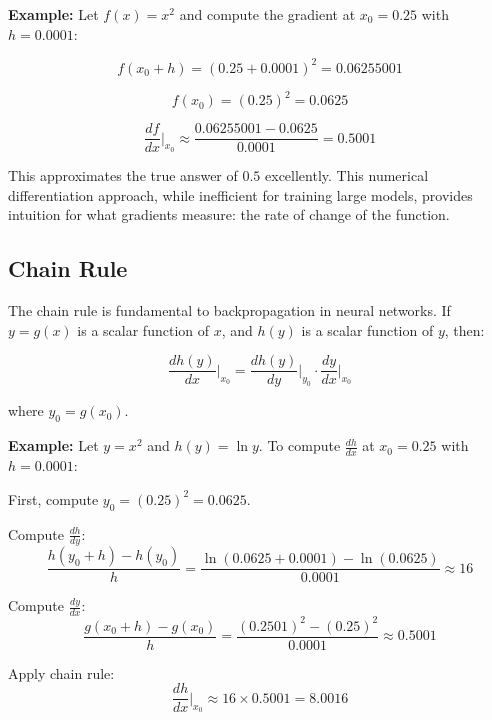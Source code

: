 \documentclass{book}
\begin{document}
\textbf{Example:} Let $f(x) = x^2$ and compute the gradient at $x_0 = 0.25$ with $h = 0.0001$:

\begin{equation}
f(x_0 + h) = (0.25 + 0.0001)^2 = 0.06255001
\end{equation}

\begin{equation}
f(x_0) = (0.25)^2 = 0.0625
\end{equation}

\begin{equation}
\frac{df}{dx}\bigg|_{x_0} \approx \frac{0.06255001 - 0.0625}{0.0001} = 0.5001
\end{equation}

This approximates the true answer of $0.5$ excellently. This numerical differentiation approach, while inefficient for training large models, provides intuition for what gradients measure: the rate of change of the function.

\subsection{Chain Rule}
\label{sec:chain-rule}

The chain rule is fundamental to backpropagation in neural networks. If $y = g(x)$ is a scalar function of $x$, and $h(y)$ is a scalar function of $y$, then:

\begin{equation}
\label{eq:chain-rule}
\frac{dh(y)}{dx}\bigg|_{x_0} = \frac{dh(y)}{dy}\bigg|_{y_0} \cdot \frac{dy}{dx}\bigg|_{x_0}
\end{equation}

where $y_0 = g(x_0)$.

\textbf{Example:} Let $y = x^2$ and $h(y) = \ln y$. To compute $\frac{dh}{dx}$ at $x_0 = 0.25$ with $h = 0.0001$:

First, compute $y_0 = (0.25)^2 = 0.0625$.

Compute $\frac{dh}{dy}$:
\begin{equation}
\frac{h(y_0 + h) - h(y_0)}{h} = \frac{\ln(0.0625 + 0.0001) - \ln(0.0625)}{0.0001} \approx 16
\end{equation}

Compute $\frac{dy}{dx}$:
\begin{equation}
\frac{g(x_0 + h) - g(x_0)}{h} = \frac{(0.2501)^2 - (0.25)^2}{0.0001} \approx 0.5001
\end{equation}

Apply chain rule:
\begin{equation}
\frac{dh}{dx}\bigg|_{x_0} \approx 16 \times 0.5001 = 8.0016
\end{equation}
\end{document}
